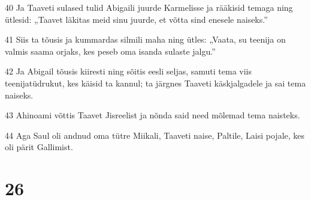 \par 40 Ja Taaveti sulased tulid Abigaili juurde Karmelisse ja rääkisid temaga ning ütlesid: „Taavet läkitas meid sinu juurde, et võtta sind enesele naiseks.”
\par 41 Siis ta tõusis ja kummardas silmili maha ning ütles: „Vaata, su teenija on valmis saama orjaks, kes peseb oma isanda sulaste jalgu.”
\par 42 Ja Abigail tõusis kiiresti ning sõitis eesli seljas, samuti tema viis teenijatüdrukut, kes käisid ta kannul; ta järgnes Taaveti käskjalgadele ja sai tema naiseks.
\par 43 Ahinoami võttis Taavet Jisreelist ja nõnda said need mõlemad tema naisteks.
\par 44 Aga Saul oli andnud oma tütre Miikali, Taaveti naise, Paltile, Laisi pojale, kes oli pärit Gallimist.

\chapter{26}

